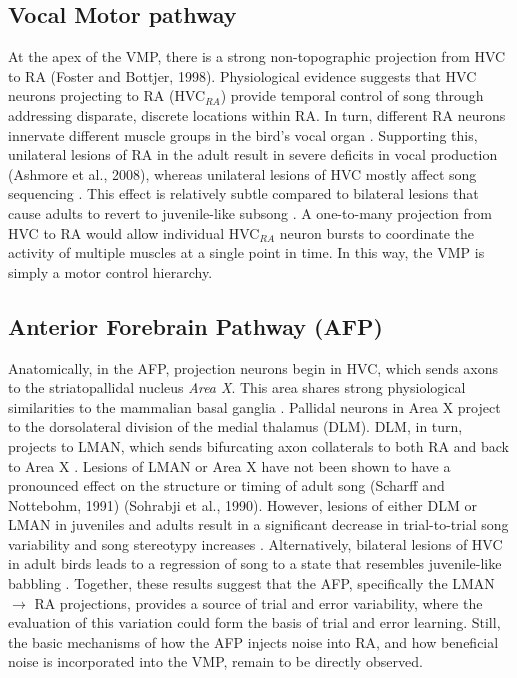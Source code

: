 \subsection{Vocal Motor pathway	}

At the apex of the VMP, there is a strong non-topographic projection from HVC to RA (Foster and Bottjer, 1998). Physiological evidence suggests that HVC neurons projecting to RA (HVC$_{RA}$) provide temporal control of song through addressing disparate, discrete locations within RA. In turn, different RA neurons innervate different muscle groups in the bird's vocal organ \cite{Fee2011-en}. Supporting this, unilateral lesions of RA in the adult result in severe deficits in vocal production (Ashmore et al., 2008), whereas unilateral lesions of HVC mostly affect song sequencing \cite{Williams2004-hn}. This effect is relatively subtle compared to bilateral lesions that cause adults to revert to juvenile-like subsong \cite{Aronov2008-kx}. A one-to-many projection from HVC to RA would allow individual HVC$_{RA}$ neuron bursts to coordinate the activity of multiple muscles at a single point in time. In this way, the VMP is simply a motor control hierarchy.


\subsection{Anterior Forebrain Pathway (AFP)}

Anatomically, in the AFP, projection neurons begin in HVC, which sends axons to the striatopallidal nucleus \emph{Area X}. This area shares strong physiological similarities to the mammalian basal ganglia \cite{Goldberg2010-fm}  \cite{Fee2011-en}. Pallidal neurons in Area X project to the dorsolateral division of the medial thalamus (DLM). DLM, in turn, projects to LMAN, which sends bifurcating axon collaterals to both RA and back to Area X \cite{Nixdorf-Bergweiler1995-nj}  \cite{Vates1995-zr}. Lesions of LMAN or Area X have not been shown to have a pronounced effect on the structure or timing of adult song \cite{Olveczky2005-mc} (Scharff and Nottebohm, 1991) (Sohrabji et al., 1990). However, lesions of either DLM or LMAN in juveniles and adults result in a significant decrease in trial-to-trial song variability and song stereotypy increases \cite{Aronov2008-kx}  \cite{Fee2011-en} \cite{Kao2006-gp}  \cite{Olveczky2005-mc}. Alternatively, bilateral lesions of HVC in adult birds leads to a regression of song to a state that resembles juvenile-like babbling \cite{Aronov2008-kx} . Together, these results suggest that the AFP, specifically the LMAN $\rightarrow$ RA projections, provides a source of trial and error variability, where the evaluation of this variation could form the basis of trial and error learning. Still, the basic mechanisms of how the AFP injects noise into RA, and how beneficial noise is incorporated into the VMP, remain to be directly observed. 
 
